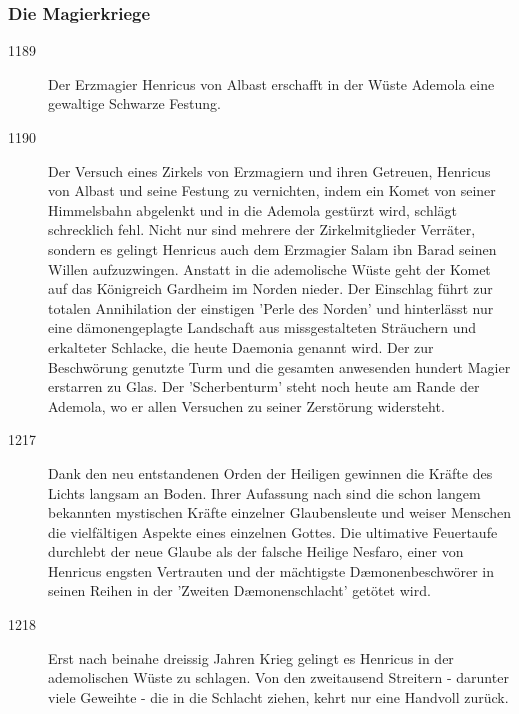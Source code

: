 \documentclass[12pt,twoside,twocolumn,openany]{book}
\begin{document}
\subsubsection{Die Magierkriege}
\begin{description}
	\item[1189] Der Erzmagier Henricus von Albast erschafft in der Wüste Ademola eine gewaltige Schwarze Festung.
	\item[1190] Der Versuch eines Zirkels von Erzmagiern und ihren Getreuen, Henricus von Albast und seine Festung zu vernichten, indem ein Komet von seiner Himmelsbahn abgelenkt und in die Ademola gestürzt wird, schlägt schrecklich fehl. Nicht nur sind mehrere der Zirkelmitglieder Verräter, sondern es gelingt Henricus auch dem Erzmagier Salam ibn Barad seinen Willen aufzuzwingen. Anstatt in die ademolische Wüste geht der Komet auf das Königreich Gardheim im Norden nieder. Der Einschlag führt zur totalen Annihilation der einstigen 'Perle des Norden' und hinterlässt nur eine dämonengeplagte Landschaft aus missgestalteten Sträuchern und erkalteter Schlacke, die heute Daemonia genannt wird. Der zur Beschwörung genutzte Turm und die gesamten anwesenden hundert Magier erstarren zu Glas. Der 'Scherbenturm' steht noch heute am Rande der Ademola, wo er allen Versuchen zu seiner Zerstörung widersteht.
	\item[1217] Dank den neu entstandenen Orden der Heiligen gewinnen die Kräfte des Lichts langsam an Boden. Ihrer Aufassung nach sind die schon langem bekannten mystischen Kräfte einzelner Glaubensleute und weiser Menschen die vielfältigen Aspekte eines einzelnen Gottes. Die ultimative Feuertaufe durchlebt der neue Glaube als der falsche Heilige Nesfaro, einer von Henricus engsten Vertrauten und der mächtigste D\ae monenbeschwörer in seinen Reihen in der 'Zweiten D\ae monenschlacht' getötet wird.
	\item[1218] Erst nach beinahe dreissig Jahren Krieg gelingt es Henricus in der ademolischen Wüste zu schlagen. Von den zweitausend Streitern - darunter viele Geweihte  - die in die Schlacht ziehen, kehrt nur eine Handvoll zurück.
\end{description}
	
\end{document}
